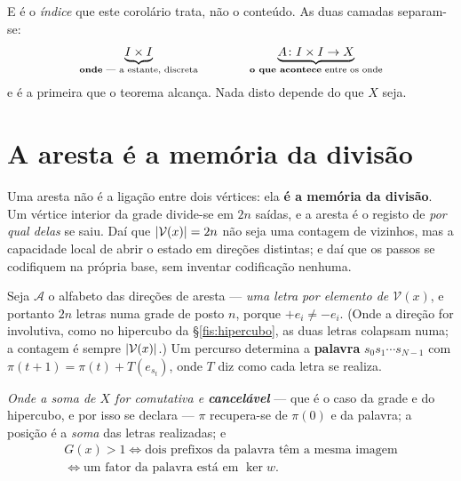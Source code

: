 \documentclass[livro.tex]{subfiles}
\begin{document}
\medskip\noindent E é o \emph{índice} que este corolário trata, não o conteúdo.
As duas camadas separam-se:
\[
\underbrace{I\times I}_{\text{\textbf{onde} --- a estante, discreta}}
\qquad\qquad
\underbrace{A\colon I\times I\to X}_{\text{\textbf{o que acontece} entre os onde}}
\]
e é a primeira que o teorema alcança. Nada disto depende do que $X$ seja.


\section{A aresta é a memória da divisão}\label{fis:folha}

\noindent Uma aresta não é a ligação entre dois vértices: ela \textbf{é a memória
da divisão}. Um vértice interior da grade divide-se em $2n$ saídas, e a aresta é
o registo de \emph{por qual delas} se saiu. Daí que $\lvert \mathcal{V}(x)\rvert=2n$ não
seja uma contagem de vizinhos, mas a capacidade local de abrir o estado em
direções distintas; e daí que os passos se codifiquem na própria base, sem
inventar codificação nenhuma.

\begin{definicao}\label{fis:def:palavra}
Seja $\mathcal{A}$ o alfabeto das direções de aresta --- \emph{uma letra por
elemento de $\mathcal{V}(x)$}, e portanto $2n$ letras numa grade de posto $n$,
porque $+e_i\neq-e_i$. (Onde a direção for involutiva, como no hipercubo da
§\ref{fis:hipercubo}, as duas letras colapsam numa; a contagem é sempre
$\lvert \mathcal{V}(x)\rvert$.) Um percurso determina a \textbf{palavra}
$s_0s_1\cdots s_{N-1}$ com
$\pi(t+1)=\pi(t)+T(e_{s_t})$, onde $T$ diz como cada letra se realiza.
\end{definicao}

\begin{teorema}\label{fis:thm:palavra}
\emph{Onde a soma de $X$ for comutativa e \textbf{cancelável}} --- que é o caso
da grade e do hipercubo, e por isso se declara --- $\pi$ recupera-se de $\pi(0)$
e da palavra; a posição é a \emph{soma} das letras realizadas; e
\[
\begin{array}{c}
G(x)>1
\iff
\text{dois prefixos da palavra têm a mesma imagem}\\[3pt]
\iff
\text{um fator da palavra está em }\ker w .
\end{array}
\]
\end{teorema}
\end{document}

